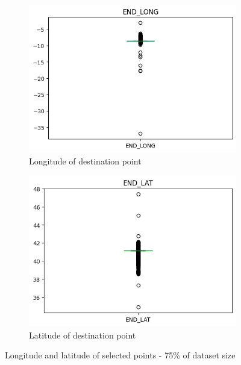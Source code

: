 \documentclass[12pt, titlepage]{article}
\begin{document}
\begin{figure}[H]\ContinuedFloat
    \centering
    \begin{subfigure}[t]{.49\textwidth}
        \includegraphics[width =\textwidth]{image/end_long_train.png}
        \caption{Longitude of destination point}
        \label{fig:long_lat}
    \end{subfigure}
    \hfill
    \begin{subfigure}[t]{.49\textwidth}
        \includegraphics[width =\textwidth]{image/end_lat_train.png}
        \caption{Latitude of destination point}
        \label{fig:long_lat}
    \end{subfigure}
    \caption{Longitude and latitude of selected points - 75\% of dataset size}
    \label{fig:long_lat}
\end{figure}
\end{document}

